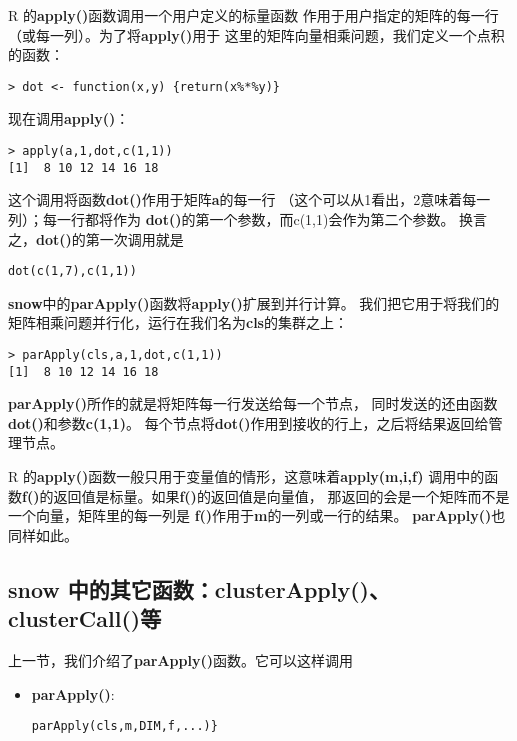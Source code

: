 R 的{\bf apply()}函数调用一个用户定义的标量函数
作用于用户指定的矩阵的每一行（或每一列）。为了将{\bf apply()}用于
这里的矩阵向量相乘问题，我们定义一个点积的函数：

\begin{lstlisting}
> dot <- function(x,y) {return(x%*%y)}
\end{lstlisting}

现在调用{\bf apply()}：

\begin{lstlisting}
> apply(a,1,dot,c(1,1))
[1]  8 10 12 14 16 18
\end{lstlisting}

这个调用将函数{\bf dot()}作用于矩阵{\bf a}的每一行
（这个可以从1看出，2意味着每一列）；每一行都将作为
{\bf dot()}的第一个参数，而c(1,1)会作为第二个参数。
换言之，{\bf dot()}的第一次调用就是

\begin{lstlisting}
dot(c(1,7),c(1,1))
\end{lstlisting}

{\bf snow}中的{\bf parApply()}函数将{\bf apply()}扩展到并行计算。
我们把它用于将我们的矩阵相乘问题并行化，运行在我们名为{\bf cls}的集群之上：

\begin{lstlisting}
> parApply(cls,a,1,dot,c(1,1))
[1]  8 10 12 14 16 18
\end{lstlisting}

{\bf parApply()}所作的就是将矩阵每一行发送给每一个节点，
同时发送的还由函数{\bf dot()}和参数{\bf c(1,1)}。
每个节点将{\bf dot()}作用到接收的行上，之后将结果返回给管理节点。

R 的{\bf apply()}函数一般只用于变量值的情形，这意味着{\bf apply(m,i,f)}
调用中的函数{\bf f()}的返回值是标量。如果{\bf f()}的返回值是向量值，
那返回的会是一个矩阵而不是一个向量，矩阵里的每一列是
{\bf f()}作用于{\bf m}的一列或一行的结果。
{\bf parApply()}也同样如此。

\subsection{snow 中的其它函数：clusterApply()、clusterCall()等}

上一节，我们介绍了{\bf parApply()}函数。它可以这样调用

\begin{itemize}

\item {{\bf parApply()}:}

\begin{lstlisting}
parApply(cls,m,DIM,f,...)}
\end{lstlisting}

\end{itemize}

